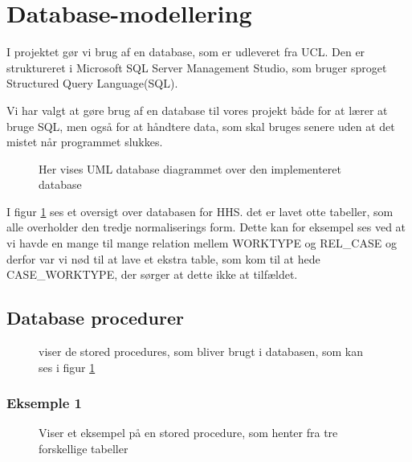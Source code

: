 \section{Database-modellering}\label{databasemodellering}

I projektet gør vi brug af en database, som er udleveret fra UCL. Den er struktureret i Microsoft SQL Server Management Studio, som bruger sproget Structured Query Language(SQL).



Vi har valgt at gøre brug af en database til vores projekt både for at lærer at bruge SQL, men også for at håndtere data, som skal bruges senere uden at det mistet når programmet slukkes.

\begin{figure}[H]
    \caption{Her vises UML database diagrammet over den implementeret database}
    \label{fig:DatabaseDiagram}
\end{figure}

I figur \ref{fig:DatabaseDiagram} ses et oversigt over databasen for HHS. det er lavet otte tabeller, som alle overholder den tredje normaliserings form. \cite{Database} Dette kan for eksempel ses ved at vi havde en mange til mange relation mellem WORKTYPE og REL\_CASE og derfor var vi nød til at lave et ekstra table, som kom til at hede CASE\_WORKTYPE, der sørger at dette ikke at tilfældet. 

\subsection{Database procedurer}

\begin{figure}[h]
    \caption{viser de stored procedures, som bliver brugt i databasen, som kan ses i figur \ref{fig:DatabaseDiagram}}
    \label{fig:SP}
\end{figure}

\subsubsection{Eksemple 1}
\begin{figure}[H]
    \caption{Viser et eksempel på en stored procedure, som henter fra tre forskellige tabeller}
    \label{fig:SPADRRESCUSTOMER}
\end{figure}

